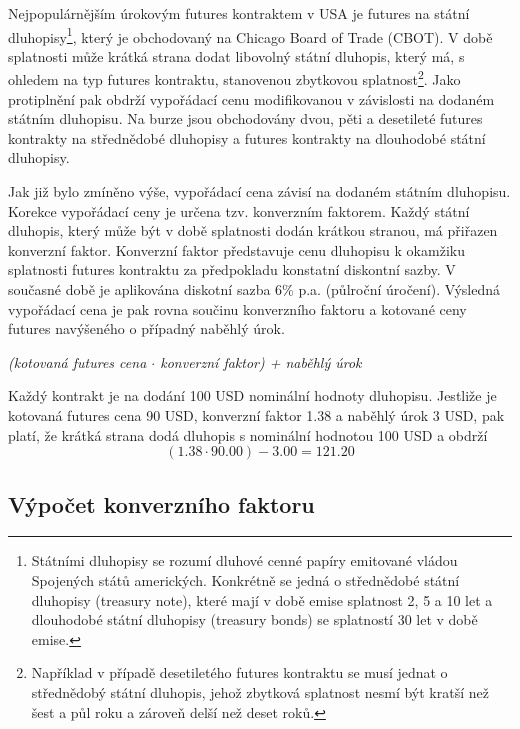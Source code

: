\documentclass[a4paper]{book}
\begin{document}
Nejpopulárnějším úrokovým futures kontraktem v USA je futures na státní dluhopisy\footnote{Státními dluhopisy se rozumí dluhové cenné papíry emitované vládou Spojených států amerických. Konkrétně se jedná o střednědobé státní dluhopisy (treasury note), které mají v době emise splatnost 2, 5 a 10 let a dlouhodobé státní dluhopisy (treasury bonds) se splatností 30 let v době emise.}, který je obchodovaný na Chicago Board of Trade (CBOT). V době splatnosti může krátká strana dodat libovolný státní dluhopis, který má, s ohledem na typ futures kontraktu, stanovenou zbytkovou splatnost\footnote{Například v případě desetiletého futures kontraktu se musí jednat o střednědobý státní dluhopis, jehož zbytková splatnost nesmí být kratší než šest a půl roku a zároveň delší než deset roků.}. Jako protiplnění pak obdrží vypořádací cenu modifikovanou v závislosti na dodaném státním dluhopisu. Na burze jsou obchodovány dvou, pěti a desetileté futures kontrakty na střednědobé dluhopisy a futures kontrakty na dlouhodobé státní dluhopisy.

Jak již bylo zmíněno výše, vypořádací cena závisí na dodaném státním dluhopisu. Korekce vypořádací ceny je určena tzv. konverzním faktorem. Každý státní dluhopis, který může být v době splatnosti dodán krátkou stranou, má přiřazen konverzní faktor. Konverzní faktor představuje cenu dluhopisu k okamžiku splatnosti futures kontraktu za předpokladu konstatní diskontní sazby. V současné době je aplikována diskotní sazba 6\% p.a. (půlroční úročení). Výsledná vypořádací cena je pak rovna součinu konverzního faktoru a kotované ceny futures navýšeného o případný naběhlý úrok.
\begin{center}
 \textit{(kotovaná futures cena $\cdot$ konverzní faktor) + naběhlý úrok}
\end{center}
Každý kontrakt je na dodání 100 USD nominální hodnoty dluhopisu. Jestliže je kotovaná futures cena 90 USD, konverzní faktor 1.38 a naběhlý úrok 3 USD, pak platí, že krátká strana dodá dluhopis s nominální hodnotou 100 USD a obdrží
\begin{equation*}
  (1.38 \cdot 90.00) - 3.00 = 121.20
\end{equation*}

\subsection{Výpočet konverzního faktoru}
\end{document}
